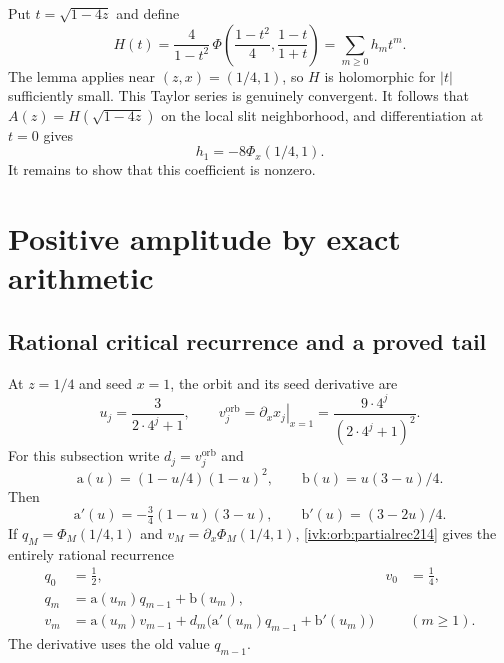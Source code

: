 \documentclass[11pt,letterpaper]{article}
\theoremstyle{remark}\newtheorem{remark}[theorem]{Remark}
\begin{document}
Put $t=\sqrt{1-4z}$ and define
\begin{equation}\label{ivk:orb:H214}
H(t)=\frac4{1-t^2}\,
\Phi\left(\frac{1-t^2}{4},\frac{1-t}{1+t}\right)
=\sum_{m\ge0}h_mt^m.
\end{equation}
The lemma applies near $(z,x)=(1/4,1)$, so $H$ is holomorphic for
$|t|$ sufficiently small. This Taylor series is genuinely convergent.
It follows that $A(z)=H(\sqrt{1-4z})$ on the local slit neighborhood,
and differentiation at $t=0$ gives
\begin{equation}\label{ivk:orb:h1}
h_1=-8\Phi_x(1/4,1).
\end{equation}
It remains to show that this coefficient is nonzero.

\section{Positive amplitude by exact arithmetic}\label{ivk:orb:sec:amplitude}
\subsection{Rational critical recurrence and a proved tail}
At $z=1/4$ and seed $x=1$, the orbit and its seed derivative are
\begin{equation}\label{ivk:orb:criticalorbit}
u_j=\frac3{2\cdot4^j+1},\qquad
v_j^{\mathrm{orb}}=\left.\partial_xx_j\right|_{x=1}
=\frac{9\cdot4^j}{(2\cdot4^j+1)^2}.
\end{equation}
For this subsection write $d_j=v_j^{\mathrm{orb}}$ and
\[
\mathrm a(u)=(1-u/4)(1-u)^2,\qquad
\mathrm b(u)=u(3-u)/4.
\]
Then
\[
\mathrm a'(u)=-\tfrac34(1-u)(3-u),\qquad
\mathrm b'(u)=(3-2u)/4.
\]
If $q_M=\Phi_M(1/4,1)$ and $v_M=\partial_x\Phi_M(1/4,1)$,
\eqref{ivk:orb:partialrec214} gives the entirely rational recurrence
\begin{equation}\label{ivk:orb:criticalrec}
\begin{aligned}
q_0&=\tfrac12,&v_0&=\tfrac14,\\
q_m&=\mathrm a(u_m)q_{m-1}+\mathrm b(u_m),\\
v_m&=\mathrm a(u_m)v_{m-1}
+d_m\bigl(\mathrm a'(u_m)q_{m-1}+\mathrm b'(u_m)\bigr)
&& (m\ge1).
\end{aligned}
\end{equation}
The derivative uses the old value $q_{m-1}$.
\end{document}
